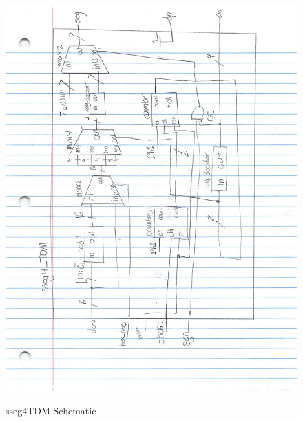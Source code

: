 \documentclass[11pt]{article}
\begin{document}
\begin{figure}[ht]\centering
	\caption{sseg4TDM Schematic}
	\includegraphics[width=1.15 \textwidth]{sseg4_TDM_Schematic.pdf}
	\label{fig:picture}
\end{figure}
\end{document}
